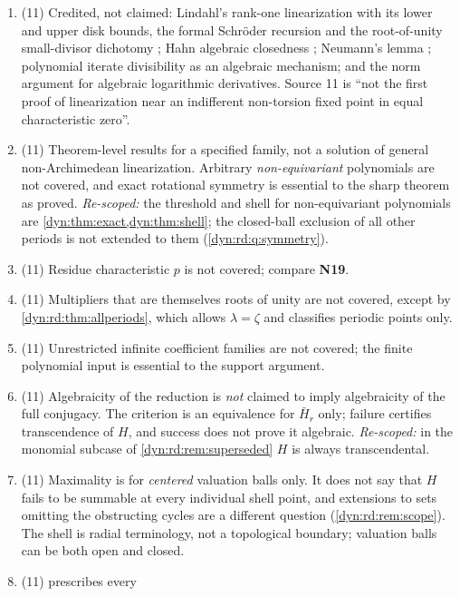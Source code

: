\documentclass[11pt,letterpaper]{article}
\theoremstyle{definition}
\theoremstyle{remark}
\numberwithin{equation}{section}
\begin{document}
\begin{enumerate}[label=\textbf{N\arabic*.},ref=\textbf{N\arabic*},leftmargin=3.2em,start=126]
available, and no source-code, Lean-build or full-manuscript review is
claimed. The main proofs use no unreviewed repository theorem.
\item (11) Credited, not claimed: Lindahl's rank-one linearization with its
lower and upper disk bounds, the formal Schr\"oder recursion and the
root-of-unity small-divisor dichotomy \cite[Thm.~1.1, Lemma~3.3]{Lindahl};
Hahn algebraic closedness \cite[Cor.~4]{Poonen}; Neumann's lemma
\cite[Lemma~2.36]{Marker}; polynomial iterate divisibility as an algebraic
mechanism; and the norm argument for algebraic logarithmic derivatives.
Source 11 is ``not the first proof of linearization near an indifferent
non-torsion fixed point in equal characteristic zero''.
\item (11) Theorem-level results for a specified family, not a solution of
general non-Archimedean linearization. Arbitrary \emph{non-equivariant}
polynomials are not covered, and exact rotational symmetry is essential to
the sharp theorem as proved. \emph{Re-scoped:} the threshold and shell for
non-equivariant polynomials are \cref{dyn:thm:exact,dyn:thm:shell}; the
closed-ball exclusion of all other periods is not extended to them
(\cref{dyn:rd:q:symmetry}).
\item (11) Residue characteristic $p$ is not covered; compare \textbf{N19}.
\item (11) Multipliers that are themselves roots of unity are not covered,
except by \cref{dyn:rd:thm:allperiods}, which allows $\lambda=\zeta$ and
classifies periodic points only.
\item (11) Unrestricted infinite coefficient families are not covered; the
finite polynomial input is essential to the support argument.
\item\label{dyn:rd:nc:oneway} (11) Algebraicity of the reduction is
\emph{not} claimed to imply algebraicity of the full conjugacy. The criterion
is an equivalence for $\bar H_r$ only; failure certifies transcendence of
$H$, and success does not prove it algebraic. \emph{Re-scoped:} in the
monomial subcase of \cref{dyn:rd:rem:superseded} $H$ is always
transcendental.
\item (11) Maximality is for \emph{centered} valuation balls only. It does not
say that $H$ fails to be summable at every individual shell point, and
extensions to sets omitting the obstructing cycles are a different question
(\cref{dyn:rd:rem:scope}). The shell is radial terminology, not a
topological boundary; valuation balls can be both open and closed.
\item (11)  prescribes every

\end{enumerate}
\end{document}
